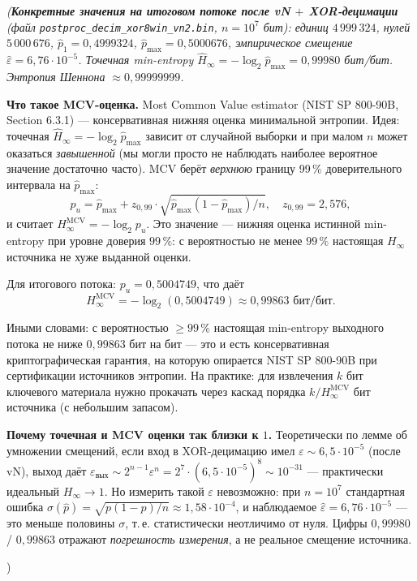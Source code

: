 \documentclass[12pt,a4paper]{extarticle}
\newcommand{\note}[1]{%
  \par
  {\small\color{noteclr}\itshape (#1)}%
  \par}
\begin{document}
\note{\textbf{Конкретные значения на итоговом потоке после vN $+$
XOR-децимации} (файл \texttt{postproc\_decim\_xor8win\_vn2.bin}, $n=10^7$
бит): единиц $4\,999\,324$, нулей $5\,000\,676$, $\hat p_1 = 0{,}4999324$,
$\hat p_{\max} = 0{,}5000676$, эмпирическое смещение
$\hat\varepsilon = 6{,}76\cdot 10^{-5}$. Точечная min-entropy
$\hat H_\infty = -\log_2 \hat p_{\max} = 0{,}99980$ бит/бит. Энтропия
Шеннона $\approx 0{,}99999999$.

\medskip
\textbf{Что такое MCV-оценка.} Most Common Value estimator (NIST SP 800-90B,
Section 6.3.1) --- консервативная нижняя оценка минимальной энтропии.
Идея: точечная $\hat H_\infty = -\log_2 \hat p_{\max}$ зависит от случайной
выборки и при малом $n$ может оказаться \emph{завышенной} (мы могли просто
не наблюдать наиболее вероятное значение достаточно часто). MCV берёт
\emph{верхнюю} границу 99\,\% доверительного интервала на $\hat p_{\max}$:
\[
  p_u = \hat p_{\max} + z_{0{,}99}\cdot\sqrt{\hat p_{\max}(1-\hat p_{\max})/n},
  \quad z_{0{,}99}=2{,}576,
\]
и считает $H_\infty^{\text{MCV}} = -\log_2 p_u$. Это значение --- нижняя
оценка истинной min-entropy при уровне доверия $99\,\%$: с вероятностью не
менее $99\,\%$ настоящая $H_\infty$ источника не хуже выданной оценки.

Для итогового потока: $p_u = 0{,}5004749$, что даёт
\[
  H_\infty^{\text{MCV}} = -\log_2(0{,}5004749) \approx 0{,}99863 \text{ бит/бит}.
\]

Иными словами: с вероятностью $\ge 99\,\%$ настоящая min-entropy выходного
потока не ниже $0{,}99863$ бит на бит --- это и есть консервативная
криптографическая гарантия, на которую опирается NIST SP 800-90B при
сертификации источников энтропии. На практике: для извлечения $k$ бит
ключевого материала нужно прокачать через каскад порядка $k/H_\infty^{\text{MCV}}$
бит источника (с небольшим запасом).

\medskip
\textbf{Почему точечная и MCV оценки так близки к $1$.} Теоретически по лемме
об умножении смещений, если вход в XOR-децимацию имел
$\varepsilon\sim 6{,}5\cdot 10^{-5}$ (после vN), выход даёт
$\varepsilon_{\text{вых}}\sim 2^{n-1}\varepsilon^n = 2^7\cdot(6{,}5\cdot
10^{-5})^8\sim 10^{-31}$ --- практически идеальный $H_\infty\to 1$. Но
измерить такой $\varepsilon$ невозможно: при $n=10^7$ стандартная ошибка
$\sigma(\hat p) = \sqrt{p(1-p)/n}\approx 1{,}58\cdot 10^{-4}$, и наблюдаемое
$\hat\varepsilon = 6{,}76\cdot 10^{-5}$ --- это меньше половины $\sigma$,
т.\,е. статистически неотличимо от нуля. Цифры $0{,}99980$ / $0{,}99863$
отражают \emph{погрешность измерения}, а не реальное смещение источника.

}
\end{document}
